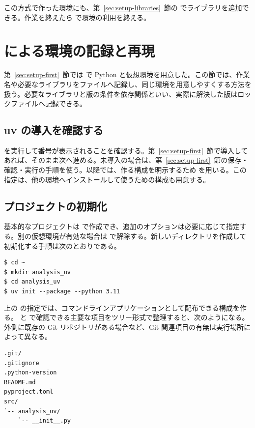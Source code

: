 この方式で作った環境にも、第~\ref{sec:setup-libraries}~節の  でライブラリを追加できる。作業を終えたら  で環境の利用を終える。

\section{ による環境の記録と再現}

第~\ref{sec:setup-first}~節では  で Python と仮想環境を用意した。この節では、作業名や必要なライブラリをファイルへ記録し、同じ環境を用意しやすくする方法を扱う。必要なライブラリと版の条件を依存関係といい、実際に解決した版はロックファイルへ記録できる。

\subsection{uv の導入を確認する}

 を実行して番号が表示されることを確認する。第~\ref{sec:setup-first}~節で導入してあれば、そのまま次へ進める。未導入の場合は、第~\ref{sec:setup-first}~節の保存・確認・実行の手順を使う。以降では、作る構成を明示するため  を用いる。この指定は、他の環境へインストールして使うための構成も用意する。

\subsection{プロジェクトの初期化}

基本的なプロジェクトは  で作成でき、追加のオプションは必要に応じて指定する。別の仮想環境が有効な場合は  で解除する。新しいディレクトリを作成して初期化する手順は次のとおりである。

\begin{lstlisting}[numbers=none, xleftmargin=2\zw]
$ cd ~
$ mkdir analysis_uv
$ cd analysis_uv
$ uv init --package --python 3.11
\end{lstlisting}

上の  の指定では、コマンドラインアプリケーションとして配布できる構成を作る。 と  で確認できる主要な項目をツリー形式で整理すると、次のようになる。外側に既存の Git リポジトリがある場合など、Git 関連項目の有無は実行場所によって異なる。

\begin{lstlisting}[numbers=none, xleftmargin=2\zw, title={analysis\_uv/ の初期構成}]
.git/
.gitignore
.python-version
README.md
pyproject.toml
src/
`-- analysis_uv/
    `-- __init__.py
\end{lstlisting}

